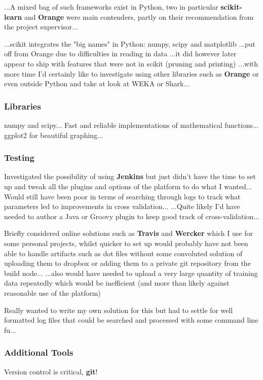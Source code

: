 ...A mixed bag of such frameworks exist in Python, two in particular
\textbf{scikit-learn}\citep{scikit-learn} and \textbf{Orange}\citep{orange}
were main contenders, partly on their recommendation from the project
supervisor...

...scikit integrates the "big names" in Python: numpy, scipy and matplotlib
...put off from Orange due to difficulties in reading in data ...it did however
later appear to ship with features that were not in scikit (pruning and
printing) ...with more time I'd certainly like to investigate using other
libraries such as \textbf{Orange} or even outside Python and take at look at WEKA
or Shark...

\subsubsection{Libraries}
numpy\citep{numpyscipy} and scipy\citep{scipy}... Fast and reliable implementations of
mathematical functions...  ggplot2\citep{ggplot2} for beautiful graphing...

\subsubsection{Testing}
Investigated the possibility of using \textbf{Jenkins}
but just didn't have the time to set up and tweak all the plugins and options of
the platform to do what I wanted... Would still have been poor in terms of
searching through logs to track what parameters led to improvements in cross
validation... ...Quite likely I'd have needed to author a Java or Groovy plugin
to keep good track of cross-validation...

Briefly considered online solutions such as \textbf{Travis} and \textbf{Wercker}
which I use for some personal projects, whilst quicker to set up would probably
have not been able to handle artifacts such as dot files without some convoluted
solution of uploading them to dropbox or adding them to a private git repository
from the build node...  ...also would have needed to upload a very large
quantity of training data repeatedly which would be inefficient (and more than
likely against reasonable use of the platform)

Really wanted to write my own solution for this but had to settle for well
formatted log files that could be searched and processed with some command line
fu...

\subsubsection{Additional Tools}
Version control is critical, \textbf{git}!


